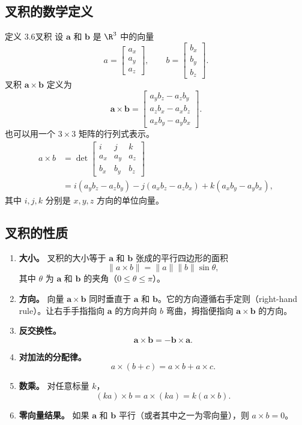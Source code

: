 \subsection{叉积的数学定义}
\begin{statement}{定义 3.6}{叉积}
设 $\symbf{a}$ 和 $\symbf{b}$ 是 $\R^3$ 中的向量
\[
  a=\begin{bmatrix}a_x\\a_y\\a_z\end{bmatrix},\qquad
  b=\begin{bmatrix}b_x\\b_y\\b_z\end{bmatrix}.
\]
叉积 $\symbf{a}\times\symbf{b}$ 定义为
\[
  \symbf{a}\times\symbf{b}=
  \begin{bmatrix}
    a_yb_z-a_zb_y\\
    a_zb_x-a_xb_z\\
    a_xb_y-a_yb_x
  \end{bmatrix}.
\]
也可以用一个 $3\times3$ 矩阵的行列式表示。
\begin{align*}
 a\times b
   &=\det\begin{bmatrix}i&j&k\\a_x&a_y&a_z\\b_x&b_y&b_z\end{bmatrix}\\
   &=i(a_yb_z-a_zb_y)-j(a_xb_z-a_zb_x)+k(a_xb_y-a_yb_x),
\end{align*}
其中 $i,j,k$ 分别是 $x,y,z$ 方向的单位向量。
\end{statement}

\subsection{叉积的性质}
\begin{enumerate}
\item \textbf{大小。}
叉积的大小等于 $\symbf{a}$ 和 $\symbf{b}$ 张成的平行四边形的面积
\[
  \lVert a\times b\rVert=\lVert a\rVert\lVert b\rVert\sin\theta,
\]
其中 $\theta$ 为 $\symbf{a}$ 和 $\symbf{b}$ 的夹角（$0\leq\theta\leq\pi$）。
\item \textbf{方向。}
向量 $\symbf{a}\times\symbf{b}$ 同时垂直于 $\symbf{a}$ 和 $\symbf{b}$。它的方向遵循右手定则（right-hand rule）。让右手手指指向 $\symbf{a}$ 的方向并向 $b$ 弯曲，拇指便指向 $\symbf{a}\times\symbf{b}$ 的方向。
\item \textbf{反交换性。}
\[
  \symbf{a}\times\symbf{b}=-\symbf{b}\times\symbf{a}.
\]
\item \textbf{对加法的分配律。}
\[
  a\times(b+c)=a\times b+a\times c.
\]
\item \textbf{数乘。} 对任意标量 $k$，%
%
\[
  (ka)\times b=a\times(ka)=k(a\times b).
\]
\item \textbf{零向量结果。}
如果 $\symbf{a}$ 和 $\symbf{b}$ 平行（或者其中之一为零向量），则 $a\times b=0$。
\end{enumerate}

